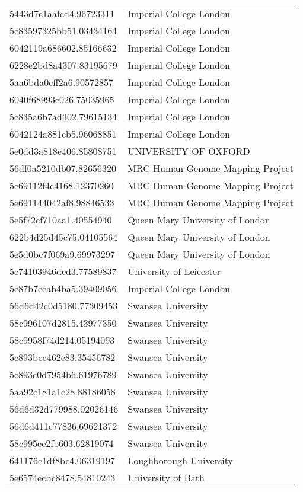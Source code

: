 \begin{tabular}{ll}
5443d7c1aafcd4.96723311 & Imperial College London \\
5c83597325bb51.03434164 & Imperial College London \\
6042119a686602.85166632 & Imperial College London \\
6228e2bd8a4307.83195679 & Imperial College London \\
5aa6bda0cff2a6.90572857 & Imperial College London \\
6040f68993e026.75035965 & Imperial College London \\
5c835a6b7ad302.79615134 & Imperial College London \\
6042124a881cb5.96068851 & Imperial College London \\
5e0dd3a818e406.85808751 & UNIVERSITY OF OXFORD \\
56df0a5210db07.82656320 & MRC Human Genome Mapping Project \\
5e69112f4c4168.12370260 & MRC Human Genome Mapping Project \\
5e691144042af8.98846533 & MRC Human Genome Mapping Project \\
5e5f72cf710aa1.40554940 & Queen Mary University of London \\
622b4d25d45c75.04105564 & Queen Mary University of London \\
5e5d0bc7f069a9.69973297 & Queen Mary University of London \\
5c74103946ded3.77589837 & University of Leicester \\
5c87b7ccab4ba5.39409056 & Imperial College London \\
56d6d42c0d5180.77309453 & Swansea University \\
58c996107d2815.43977350 & Swansea University \\
58c9958f74d214.05194093 & Swansea University \\
5c893bec462e83.35456782 & Swansea University \\
5c893c0d7954b6.61976789 & Swansea University \\
5aa92c181a1c28.88186058 & Swansea University \\
56d6d32d779988.02026146 & Swansea University \\
56d6d411c77836.69621372 & Swansea University \\
58c995ee2fb603.62819074 & Swansea University \\
641176e1df8bc4.06319197 & Loughborough University \\
5e6574ecbc8478.54810243 & University of Bath \\

\end{tabular}
